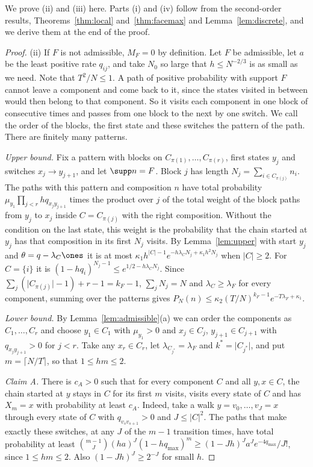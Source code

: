 We prove (ii) and (iii) here. Parts (i) and (iv) follow from the second-order
results, Theorems~\ref{thm:local} and~\ref{thm:facemax} and
Lemma~\ref{lem:discrete}, and we derive them at the end of the proof.

\begin{proof}
(ii) If $F$ is not admissible, $M_F=0$ by definition. Let $F$ be admissible, let
$a$ be the least positive rate $q_{ij}$, and take $N_0$ so large that
$h\le N^{-2/3}$ is as small as we need. Note that $T^2/N\le1$. A path of
positive probability with support $F$ cannot leave a component and come back
to it, since the states visited in between would then belong to that
component. So it visits each component in one block of consecutive times and
passes from one block to the next by one switch. We call the order of the
blocks, the first state and these switches the pattern of the path. There are
finitely many patterns.

\emph{Upper bound.} Fix a pattern with blocks on
$C_{\pi(1)},\dots,C_{\pi(r)}$, first states $y_j$ and switches
$x_j\to y_{j+1}$, and let $\supp n=F$. Block $j$ has length
$N_j=\sum_{i\in C_{\pi(j)}}n_i$. The paths with this pattern and composition $n$
have total probability $\mu_{y_1}\prod_{j<r}hq_{x_jy_{j+1}}$ times the
product over $j$ of the total weight of the block paths from $y_j$ to $x_j$
inside $C=C_{\pi(j)}$ with the right composition. Without the condition on the last
state, this weight is the probability that the chain started at $y_j$ has that
composition in its first $N_j$ visits. By Lemma~\ref{lem:upper} with start $y_j$
and $\theta=q-\lambda_C\ones$ it is at most
$\kappa_1h^{\lvert C\rvert-1}e^{-h\lambda_CN_j+\kappa_1h^2N_j}$ when
$\lvert C\rvert\ge2$.
For $C=\{i\}$ it is $(1-hq_i)^{N_j-1}\le e^{1/2-h\lambda_CN_j}$. Since
$\sum_j(\lvert C_{\pi(j)}\rvert-1)+r-1=k_F-1$, $\sum_jN_j=N$ and
$\lambda_C\ge\lambda_F$ for every component, summing over the patterns gives
$P_N(n)\le\kappa_2(T/N)^{k_F-1}e^{-T\lambda_F+\kappa_1}$.

\emph{Lower bound.} By Lemma~\ref{lem:admissible}(a) we can order the
components as $C_1,\dots,C_r$ and choose $y_1\in C_1$ with $\mu_{y_1}>0$ and
$x_j\in C_j$, $y_{j+1}\in C_{j+1}$ with $q_{x_jy_{j+1}}>0$ for $j<r$. Take any
$x_r\in C_r$, let $\lambda_{C_{j^*}}=\lambda_F$ and $k^*=\lvert C_{j^*}\rvert$,
and put $m=\lceil N/T\rceil$, so that $1\le hm\le2$.

\emph{Claim A.} There is $c_A>0$ such that for every component $C$ and all
$y,x\in C$, the chain started at $y$ stays in $C$ for its first $m$ visits,
visits every state of $C$ and has $X_m=x$ with probability at least $c_A$.
Indeed, take a walk $y=v_0,\dots,v_J=x$ through every state of $C$ with
$q_{v_sv_{s+1}}>0$ and $J\le\lvert C\rvert^2$. The paths that make exactly these
switches, at any $J$ of the $m-1$ transition times, have total probability at
least $\binom{m-1}J(ha)^J(1-hq_{\max})^m\ge(1-Jh)^Ja^Je^{-4q_{\max}}/J!$,
since $1\le hm\le2$. Also $(1-Jh)^J\ge2^{-J}$ for small $h$.


\end{proof}
